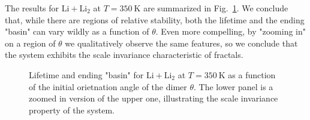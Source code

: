 \documentclass[%
 reprint,
 amsmath,amssymb,
 aps,
10pt
]{revtex4-1}
\begin{document}
The results for $\mathrm{Li} + \mathrm{Li_2}$ at $T = 350~\mathrm{K}$ are summarized in Fig.~\ref{fig:chaos}. We conclude that, while there are regions of relative stability, both the lifetime and the ending "basin" can vary wildly as a function of $\theta$. Even more compelling, by "zooming in" on a region of $\theta$ we qualitatively observe the same features, so we conclude that the system exhibits the scale invariance characteristic of fractals.

\begin{figure}[htp]

\label{fig:chaos}
\caption{Lifetime and ending "basin"  for $\mathrm{Li} + \mathrm{Li_2}$ at $T = 350~\mathrm{K}$ as a function of the initial orietnation angle of the dimer $\theta$. The lower panel is a zoomed in version of the upper one, illustrating the scale invariance property of the system.
}
\end{figure}
\end{document}

